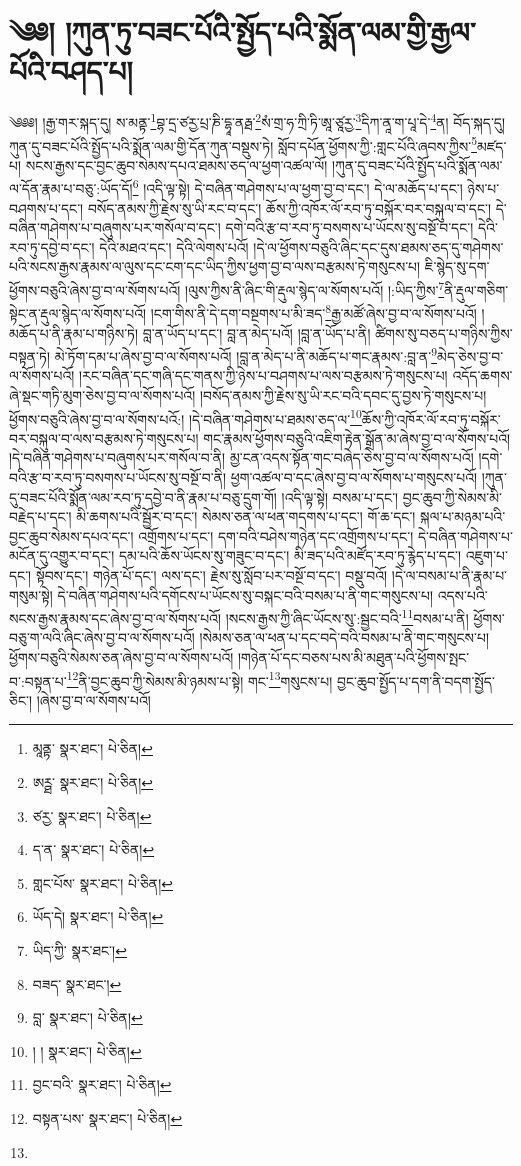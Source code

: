 \setcounter{footnote}{0} 
\chapter{༄༅། །ཀུན་ཏུ་བཟང་པོའི་སྤྱོད་པའི་སྨོན་ལམ་གྱི་རྒྱལ་པོའི་བཤད་པ།}༄༅༅། །རྒྱ་གར་སྐད་དུ། ས་མནྟ་\footnote{མཱནྟ་  སྣར་ཐང་།  པེ་ཅིན། }བྷ་དྲ་ཙརྱ་པྲ་ཎི་དྷཱ་ནརྠ་\footnote{ཨཪྠ་  སྣར་ཐང་།  པེ་ཅིན། }སཾ་གྲ་ཧ་ཀྲི་ཏི་ཨཱ་ཙཱརྱ་\footnote{ཙརྱ་  སྣར་ཐང་།  པེ་ཅིན། }དིཀ་ནཱ་ག་པཱ་དེ་\footnote{ད་ན་  སྣར་ཐང་།  པེ་ཅིན། }ན། བོད་སྐད་དུ། ཀུན་དུ་བཟང་པོའི་སྤྱོད་པའི་སྨོན་ལམ་གྱི་དོན་ཀུན་བསྡུས་ཏེ། སློབ་དཔོན་ཕྱོགས་ཀྱི་:གླང་པོའི་ཞབས་ཀྱིས་\footnote{གླང་པོས་  སྣར་ཐང་།  པེ་ཅིན། }མཛད་པ། སངས་རྒྱས་དང་བྱང་ཆུབ་སེམས་དཔའ་ཐམས་ཅད་ལ་ཕྱག་འཚལ་ལོ། །ཀུན་དུ་བཟང་པོའི་སྤྱོད་པའི་སྨོན་ལམ་ལ་དོན་རྣམ་པ་བཅུ་:ཡོད་དོ།\footnote{ཡོད་དེ།  སྣར་ཐང་།  པེ་ཅིན། } །འདི་ལྟ་སྟེ། དེ་བཞིན་གཤེགས་པ་ལ་ཕྱག་བྱ་བ་དང་། དེ་ལ་མཆོད་པ་དང་། ཉེས་པ་བཤགས་པ་དང་། བསོད་ནམས་ཀྱི་རྗེས་སུ་ཡི་རང་བ་དང་། ཆོས་ཀྱི་འཁོར་ལོ་རབ་ཏུ་བསྐོར་བར་བསྐུལ་བ་དང་། དེ་བཞིན་གཤེགས་པ་བཞུགས་པར་གསོལ་བ་དང་། དགེ་བའི་རྩ་བ་རབ་ཏུ་བསགས་པ་ཡོངས་སུ་བསྔོ་བ་དང་། དེའི་རབ་ཏུ་དབྱེ་བ་དང་། དེའི་མཐའ་དང་། དེའི་ལེགས་པའོ། །དེ་ལ་ཕྱོགས་བཅུའི་ཞིང་དང་དུས་ཐམས་ཅད་དུ་གཤེགས་པའི་སངས་རྒྱས་རྣམས་ལ་ལུས་དང་ངག་དང་ཡིད་ཀྱིས་ཕྱག་བྱ་བ་ལས་བརྩམས་ཏེ་གསུངས་པ། ཇི་སྙེད་སུ་དག་ཕྱོགས་བཅུའི་ཞེས་བྱ་བ་ལ་སོགས་པའོ། །ལུས་ཀྱིས་ནི་ཞིང་གི་རྡུལ་སྙེད་ལ་སོགས་པའོ། །:ཡིད་ཀྱིས་\footnote{ཡིད་ཀྱི་  སྣར་ཐང་། }ནི་རྡུལ་གཅིག་སྟེང་ན་རྡུལ་སྙེད་ལ་སོགས་པའོ། །ངག་གིས་ནི་དེ་དག་བསྔགས་པ་མི་ཟད་\footnote{བཟད་  སྣར་ཐང་། }རྒྱ་མཚོ་ཞེས་བྱ་བ་ལ་སོགས་པའོ། །མཆོད་པ་ནི་རྣམ་པ་གཉིས་ཏེ། བླ་ན་ཡོད་པ་དང་། བླ་ན་མེད་པའོ། །བླ་ན་ཡོད་པ་ནི། ཚིགས་སུ་བཅད་པ་གཉིས་ཀྱིས་བསྟན་ཏེ། མེ་ཏོག་དམ་པ་ཞེས་བྱ་བ་ལ་སོགས་པའོ། །བླ་ན་མེད་པ་ནི་མཆོད་པ་གང་རྣམས་:བླ་ན་\footnote{བླ་  སྣར་ཐང་།  པེ་ཅིན། }མེད་ཅེས་བྱ་བ་ལ་སོགས་པའོ། །རང་བཞིན་དང་གཞི་དང་གནས་ཀྱི་ཉེས་པ་བཤགས་པ་ལས་བརྩམས་ཏེ་གསུངས་པ། འདོད་ཆགས་ཞེ་སྡང་གཏི་མུག་ཅེས་བྱ་བ་ལ་སོགས་པའོ། །བསོད་ནམས་ཀྱི་རྗེས་སུ་ཡི་རང་བའི་དབང་དུ་བྱས་ཏེ་གསུངས་པ། ཕྱོགས་བཅུའི་ཞེས་བྱ་བ་ལ་སོགས་པའོ:། །དེ་བཞིན་གཤེགས་པ་ཐམས་ཅད་ལ་\footnote{། །  སྣར་ཐང་།  པེ་ཅིན། }ཆོས་ཀྱི་འཁོར་ལོ་རབ་ཏུ་བསྐོར་བར་བསྐུལ་བ་ལས་བརྩམས་ཏེ་གསུངས་པ། གང་རྣམས་ཕྱོགས་བཅུའི་འཇིག་རྟེན་སྒྲོན་མ་ཞེས་བྱ་བ་ལ་སོགས་པའོ། །དེ་བཞིན་གཤེགས་པ་བཞུགས་པར་གསོལ་བ་ནི། མྱ་ངན་འདས་སྟོན་གང་བཞེད་ཅེས་བྱ་བ་ལ་སོགས་པའོ། །དགེ་བའི་རྩ་བ་རབ་ཏུ་བསགས་པ་ཡོངས་སུ་བསྔོ་བ་ནི། ཕྱག་འཚལ་བ་དང་ཞེས་བྱ་བ་ལ་སོགས་པ་གསུངས་པའོ། །ཀུན་དུ་བཟང་པོའི་སྨོན་ལམ་རབ་ཏུ་དབྱེ་བ་ནི་རྣམ་པ་བཅུ་དྲུག་གོ། །འདི་ལྟ་སྟེ། བསམ་པ་དང་། བྱང་ཆུབ་ཀྱི་སེམས་མི་བརྗེད་པ་དང་། མི་ཆགས་པའི་སྦྱོར་བ་དང་། སེམས་ཅན་ལ་ཕན་གདགས་པ་དང་། གོ་ཆ་དང་། སྐལ་པ་མཉམ་པའི་བྱང་ཆུབ་སེམས་དཔའ་དང་། འགྲོགས་པ་དང་། དག་བའི་བཤེས་གཉེན་དང་འགྲོགས་པ་དང་། དེ་བཞིན་གཤེགས་པ་མངོན་དུ་འགྱུར་བ་དང་། དམ་པའི་ཆོས་ཡོངས་སུ་གཟུང་བ་དང་། མི་ཟད་པའི་མཛོད་རབ་ཏུ་རྙེད་པ་དང་། འཇུག་པ་དང་། སྟོབས་དང་། གཉེན་པོ་དང་། ལས་དང་། རྗེས་སུ་སློབ་པར་བསྔོ་བ་དང་། བསྡུ་བའོ། །དེ་ལ་བསམ་པ་ནི་རྣམ་པ་གསུམ་སྟེ། དེ་བཞིན་གཤེགས་པའི་དགོངས་པ་ཡོངས་སུ་བསྐང་བའི་བསམ་པ་ནི་གང་གསུངས་པ། འདས་པའི་སངས་རྒྱས་རྣམས་དང་ཞེས་བྱ་བ་ལ་སོགས་པའོ། །སངས་རྒྱས་ཀྱི་ཞིང་ཡོངས་སུ་:སྦྱང་བའི་\footnote{བྱང་བའི་  སྣར་ཐང་།  པེ་ཅིན། }བསམ་པ་ནི། ཕྱོགས་བཅུ་ག་ལའི་ཞིང་ཞེས་བྱ་བ་ལ་སོགས་པའོ། །སེམས་ཅན་ལ་ཕན་པ་དང་བདེ་བའི་བསམ་པ་ནི་གང་གསུངས་པ། ཕྱོགས་བཅུའི་སེམས་ཅན་ཞེས་བྱ་བ་ལ་སོགས་པའོ། །གཉེན་པོ་དང་བཅས་པས་མི་མཐུན་པའི་ཕྱོགས་སྤང་བ་:བསྟན་པ་\footnote{བསྟན་པས་  སྣར་ཐང་།  པེ་ཅིན། }ནི་བྱང་ཆུབ་ཀྱི་སེམས་མི་ཉམས་པ་སྟེ། གང་\footnote{}གསུངས་པ། བྱང་ཆུབ་སྤྱོད་པ་དག་ནི་བདག་སྤྱོད་ཅིང་། །ཞེས་བྱ་བ་ལ་སོགས་པའོ། 
